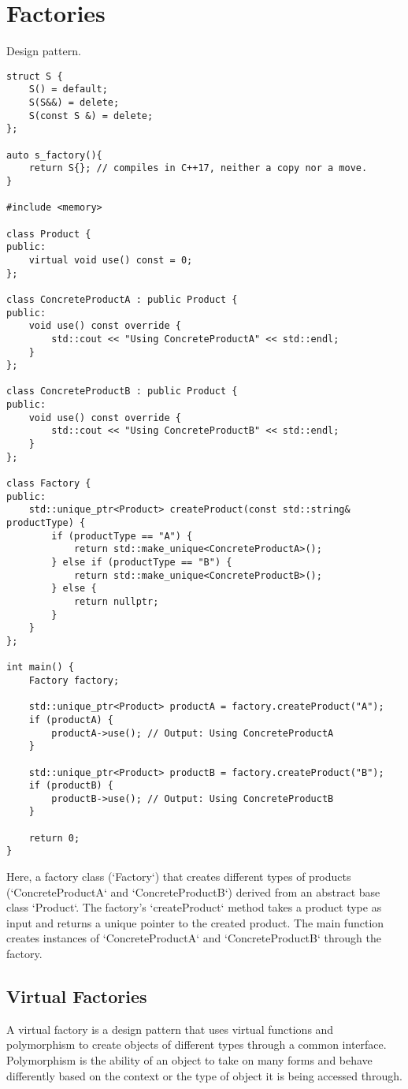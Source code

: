 \section{Factories}

Design pattern.

\begin{verbatim}
struct S {
    S() = default;
    S(S&&) = delete;
    S(const S &) = delete;
};

auto s_factory(){
    return S{}; // compiles in C++17, neither a copy nor a move.
}

#include <memory>

class Product {
public:
    virtual void use() const = 0;
};

class ConcreteProductA : public Product {
public:
    void use() const override {
        std::cout << "Using ConcreteProductA" << std::endl;
    }
};

class ConcreteProductB : public Product {
public:
    void use() const override {
        std::cout << "Using ConcreteProductB" << std::endl;
    }
};

class Factory {
public:
    std::unique_ptr<Product> createProduct(const std::string& productType) {
        if (productType == "A") {
            return std::make_unique<ConcreteProductA>();
        } else if (productType == "B") {
            return std::make_unique<ConcreteProductB>();
        } else {
            return nullptr;
        }
    }
};

int main() {
    Factory factory;
    
    std::unique_ptr<Product> productA = factory.createProduct("A");
    if (productA) {
        productA->use(); // Output: Using ConcreteProductA
    }
    
    std::unique_ptr<Product> productB = factory.createProduct("B");
    if (productB) {
        productB->use(); // Output: Using ConcreteProductB
    }
    
    return 0;
}

\end{verbatim}

Here, a factory class (`Factory`) that creates different types of products
(`ConcreteProductA` and `ConcreteProductB`) derived from an abstract base class `Product`.
The factory's `createProduct` method takes a product type as input and returns a unique pointer to the created product.
The main function creates instances of `ConcreteProductA` and `ConcreteProductB` through the factory.

\subsection{Virtual Factories}
A virtual factory is a design pattern that uses virtual functions and 
polymorphism to create objects of different types through a common interface.
Polymorphism is the ability of an object to take on many forms
and behave differently based on the context or the type of object it is being accessed through.

